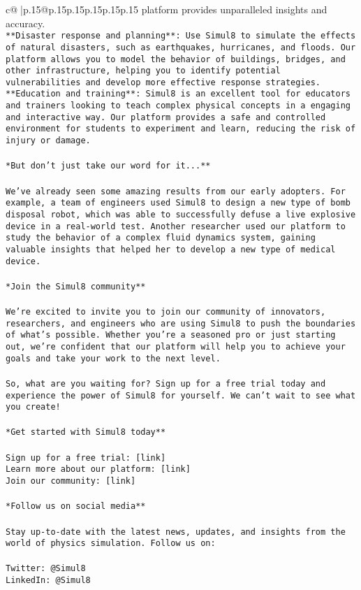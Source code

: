 \documentclass{article}
\begin{document}
{\begin{supertabular}{c@{$\;$}|p{.15\linewidth}@{}p{.15\linewidth}p{.15\linewidth}p{.15\linewidth}p{.15\linewidth}p{.15\linewidth}}
{{{platform provides unparalleled insights and accuracy.\\ \tt * **Disaster response and planning**: Use Simul8 to simulate the effects of natural disasters, such as earthquakes, hurricanes, and floods. Our platform allows you to model the behavior of buildings, bridges, and other infrastructure, helping you to identify potential vulnerabilities and develop more effective response strategies.\\ \tt * **Education and training**: Simul8 is an excellent tool for educators and trainers looking to teach complex physical concepts in a engaging and interactive way. Our platform provides a safe and controlled environment for students to experiment and learn, reducing the risk of injury or damage.\\ \tt \\ \tt **But don't just take our word for it...**\\ \tt \\ \tt We've already seen some amazing results from our early adopters. For example, a team of engineers used Simul8 to design a new type of bomb disposal robot, which was able to successfully defuse a live explosive device in a real-world test. Another researcher used our platform to study the behavior of a complex fluid dynamics system, gaining valuable insights that helped her to develop a new type of medical device.\\ \tt \\ \tt **Join the Simul8 community**\\ \tt \\ \tt We're excited to invite you to join our community of innovators, researchers, and engineers who are using Simul8 to push the boundaries of what's possible. Whether you're a seasoned pro or just starting out, we're confident that our platform will help you to achieve your goals and take your work to the next level.\\ \tt \\ \tt So, what are you waiting for? Sign up for a free trial today and experience the power of Simul8 for yourself. We can't wait to see what you create!\\ \tt \\ \tt **Get started with Simul8 today**\\ \tt \\ \tt * Sign up for a free trial: [link]\\ \tt * Learn more about our platform: [link]\\ \tt * Join our community: [link]\\ \tt \\ \tt **Follow us on social media**\\ \tt \\ \tt Stay up-to-date with the latest news, updates, and insights from the world of physics simulation. Follow us on:\\ \tt \\ \tt * Twitter: @Simul8\\ \tt * LinkedIn: @Simul8\\ \tt * }}}
\end{supertabular}}
\end{document}
